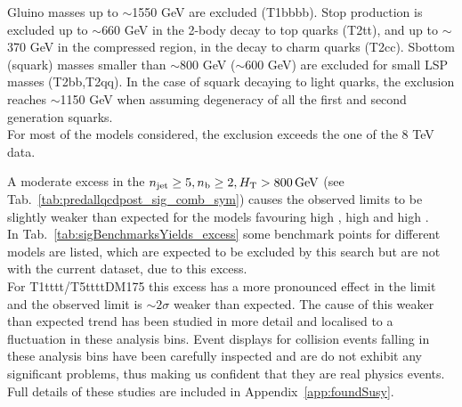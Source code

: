 \newpage
Gluino masses up to $\sim$1550 GeV are excluded (T1bbbb). 
Stop production is excluded up to $\sim$660 GeV in the 2-body decay to top quarks (T2tt), 
and up to $\sim$370 GeV in the compressed region, in the decay to charm quarks (T2cc). 
Sbottom (squark) masses smaller than $\sim$800 GeV ($\sim$600 GeV) are excluded for small LSP masses (T2bb,T2qq). 
In the case of squark decaying to light quarks, the exclusion reaches $\sim$1150 GeV when assuming degeneracy of 
all the first and second generation squarks. \\
For most of the models considered, the exclusion exceeds the one of the 8 TeV data. 

A moderate excess in the $\njet\geq5, \nb\geq2, \scalht > 800 \, \mathrm{GeV}$ (see Tab.~\ref{tab:predallqcdpost_sig_comb_sym})
causes the observed limits to be slightly weaker than expected for the models favouring high \nb, high \nj and high \scalht. \\
In Tab.~\ref{tab:sigBenchmarksYields_excess} some benchmark points for different models are listed, 
which are expected to be excluded by this search but are not with the current dataset, due to this excess. \\
For T1tttt/T5ttttDM175 this excess has a more pronounced effect in the limit and the observed limit is $\sim 2\sigma$ 
weaker than expected. The cause of this weaker than expected trend has been studied in more detail
and localised to a fluctuation in these analysis bins. Event displays for collision events 
falling in these analysis bins have been carefully inspected and are do not exhibit any 
significant problems, thus making us confident that they are real physics events. Full details
of these studies are included in Appendix~\ref{app:foundSusy}.





